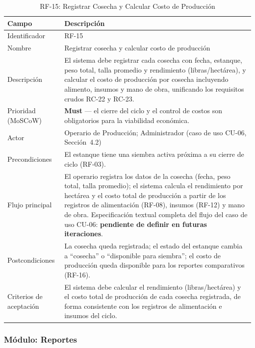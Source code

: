 \documentclass[12pt,a4paper]{article}
\begin{document}
\begin{table}[H]
\centering
\caption{RF-15: Registrar Cosecha y Calcular Costo de Producción}
\begin{tabular}{|p{3.6cm}|p{10.4cm}|}
\hline
\textbf{Campo} & \textbf{Descripción} \\
\hline
Identificador & RF-15 \\ \hline
Nombre & Registrar cosecha y calcular costo de producción \\ \hline
Descripción & El sistema debe registrar cada cosecha con fecha, estanque,
peso total, talla promedio y rendimiento (libras/hectárea), y calcular el
costo de producción por cosecha incluyendo alimento, insumos y mano de obra,
unificando los requisitos crudos RC-22 y RC-23. \\ \hline
Prioridad (MoSCoW) & \textbf{Must} --- el cierre del ciclo y el control de
costos son obligatorios para la viabilidad económica. \\ \hline
Actor & Operario de Producción; Administrador (caso de uso CU-06,
Sección~4.2) \\ \hline
Precondiciones & El estanque tiene una siembra activa próxima a su cierre de
ciclo (RF-03). \\ \hline
Flujo principal & El operario registra los datos de la cosecha (fecha, peso
total, talla promedio); el sistema calcula el rendimiento por hectárea y el
costo total de producción a partir de los registros de alimentación (RF-08),
insumos (RF-12) y mano de obra. Especificación textual completa del flujo del
caso de uso CU-06: \textbf{pendiente de definir en futuras iteraciones}. \\ \hline
Postcondiciones & La cosecha queda registrada; el estado del estanque cambia a
``cosecha'' o ``disponible para siembra''; el costo de producción queda
disponible para los reportes comparativos (RF-16). \\ \hline
Criterios de aceptación & El sistema debe calcular el rendimiento
(libras/hectárea) y el costo total de producción de cada cosecha registrada,
de forma consistente con los registros de alimentación e insumos del ciclo. \\ \hline
\end{tabular}
\end{table}

\subsubsection{Módulo: Reportes}
\end{document}
